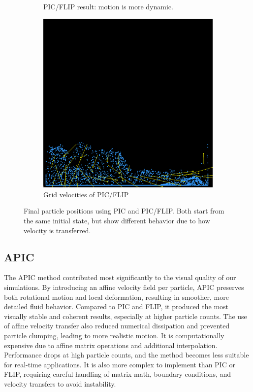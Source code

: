 \begin{figure}[h]
\begin{subfigure}[t]{0.2\textwidth}
        \caption{PIC/FLIP result: motion is more dynamic.}
    \end{subfigure}
    \hspace{1em}
    \begin{subfigure}[t]{0.2\textwidth}
        \includegraphics[width=\textwidth]{figures/pic_flip_interm.png}
        \caption{Grid velocities of PIC/FLIP}
    \end{subfigure}
    \caption{Final particle positions using PIC and PIC/FLIP. Both start from the same initial state, but show different behavior due to how velocity is transferred.}
    \label{fig:pic_comparison}
\end{figure}

\subsection{APIC}
The APIC method contributed most significantly to the visual quality of our simulations. By introducing an affine velocity field per particle, APIC preserves both rotational motion and local deformation, resulting in smoother, more detailed fluid behavior. Compared to PIC and FLIP, it produced the most visually stable and coherent results, especially at higher particle counts. The use of affine velocity transfer also reduced numerical dissipation and prevented particle clumping, leading to more realistic motion.
It is computationally expensive due to affine matrix operations and additional interpolation. Performance drops at high particle counts, and the method becomes less suitable for real-time applications. It is also more complex to implement than PIC or FLIP, requiring careful handling of matrix math, boundary conditions, and velocity transfers to avoid instability.



